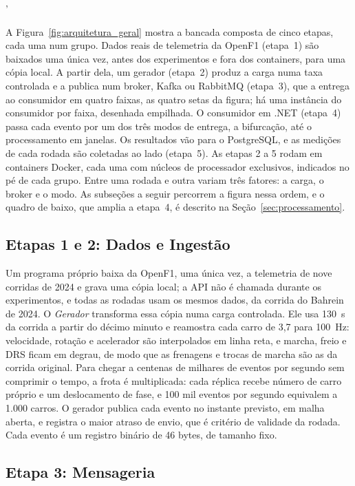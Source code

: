 '\documentclass[12pt]{article}
\begin{document}
A Figura~\ref{fig:arquitetura_geral} mostra a bancada composta de cinco etapas, cada uma num grupo. Dados reais de telemetria da OpenF1 (etapa~1) são
baixados uma única vez, antes dos experimentos e fora dos containers, para uma cópia
local. A partir dela, um gerador (etapa~2) produz a carga numa taxa controlada e a publica
num broker, Kafka ou RabbitMQ (etapa~3), que a entrega ao consumidor em quatro faixas, as
quatro setas da figura; há uma instância do consumidor por faixa, desenhada empilhada. O
consumidor em .NET (etapa~4) passa cada evento por um dos três modos de entrega, a
bifurcação, até o processamento em janelas. Os resultados vão para o PostgreSQL, e as
medições de cada rodada são coletadas ao lado (etapa~5). As etapas 2 a 5 rodam em
containers Docker, cada uma com núcleos de processador exclusivos, indicados no pé de cada
grupo. Entre uma rodada e outra variam três fatores: a carga, o broker e o modo. As
subseções a seguir percorrem a figura nessa ordem, e o quadro de baixo, que amplia a
etapa~4, é descrito na Seção~\ref{sec:processamento}.

\subsection{Etapas 1 e 2: Dados e Ingestão}
\label{sec:workload}

Um programa próprio baixa da OpenF1, uma única vez, a telemetria de nove corridas de 2024
e grava uma cópia local; a API não é chamada durante os experimentos, e todas as rodadas
usam os mesmos dados, da corrida do Bahrein de 2024. O \textit{Gerador} transforma essa
cópia numa carga controlada. Ele usa 130~s da corrida a partir do décimo minuto e
reamostra cada carro de 3,7 para 100~Hz: velocidade, rotação e acelerador são
interpolados em linha reta, e marcha, freio e DRS ficam em degrau, de modo que as
frenagens e trocas de marcha são as da corrida original. Para chegar a centenas de
milhares de eventos por segundo sem comprimir o tempo, a frota é multiplicada: cada
réplica recebe número de carro próprio e um deslocamento de fase, e 100 mil eventos por
segundo equivalem a 1.000 carros. O gerador publica cada evento no instante previsto,
em malha aberta, e registra o maior atraso de envio, que é critério de validade da rodada.
Cada evento é um registro binário de 46 bytes, de tamanho fixo.

\subsection{Etapa 3: Mensageria}
\label{sec:mensageria}
\end{document}
